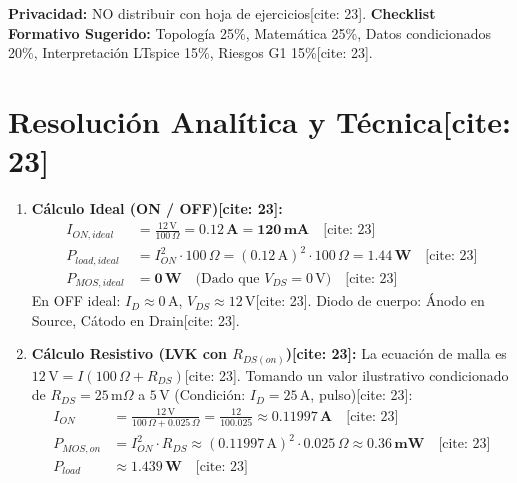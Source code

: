 \documentclass[11pt, a4paper]{article}
\begin{document}
\begin{tcolorbox}[colback=red!5, colframe=red!70!black, title=\textbf{Material Reservado Docente: Clave E1 (IRLZ44N)[cite: 23]}]
    \textbf{Privacidad:} NO distribuir con hoja de ejercicios[cite: 23]. 
    \textbf{Checklist Formativo Sugerido:} Topología 25\%, Matemática 25\%, Datos condicionados 20\%, Interpretación LTspice 15\%, Riesgos G1 15\%[cite: 23].
\end{tcolorbox}

\section*{Resolución Analítica y Técnica[cite: 23]}

\begin{enumerate}
    \setlength\itemsep{0.5em}
    \item \textbf{Cálculo Ideal (ON / OFF)[cite: 23]:}
    \begin{align*}
        I_{ON,ideal} &= \frac{12\,\text{V}}{100\,\Omega} = \mathbf{0.12\,\text{A} = 120\,\text{mA}} \quad \text{[cite: 23]} \\
        P_{load,ideal} &= I_{ON}^2 \cdot 100\,\Omega = (0.12\,\text{A})^2 \cdot 100\,\Omega = \mathbf{1.44\,\text{W}} \quad \text{[cite: 23]} \\
        P_{MOS,ideal} &= \mathbf{0\,\text{W}} \quad \text{(Dado que } V_{DS} = 0\,\text{V}\text{)} \quad \text{[cite: 23]}
    \end{align*}
    En OFF ideal: $I_D \approx 0\,\text{A}$, $V_{DS} \approx 12\,\text{V}$[cite: 23]. Diodo de cuerpo: Ánodo en Source, Cátodo en Drain[cite: 23].
    
    \item \textbf{Cálculo Resistivo (LVK con $R_{DS(on)}$)[cite: 23]:}
    La ecuación de malla es $12\,\text{V} = I (100\,\Omega + R_{DS})$[cite: 23]. 
    Tomando un valor ilustrativo condicionado de $R_{DS} = 25\,\text{m}\Omega$ a $5\,\text{V}$ (Condición: $I_D=25\,\text{A}$, pulso)[cite: 23]:
    \begin{align*}
        I_{ON} &= \frac{12\,\text{V}}{100\,\Omega + 0.025\,\Omega} = \frac{12}{100.025} \approx \mathbf{0.11997\,\text{A}} \quad \text{[cite: 23]} \\
        P_{MOS,on} &= I_{ON}^2 \cdot R_{DS} \approx (0.11997\,\text{A})^2 \cdot 0.025\,\Omega \approx \mathbf{0.36\,\text{mW}} \quad \text{[cite: 23]} \\
        P_{load} &\approx \mathbf{1.439\,\text{W}} \quad \text{[cite: 23]}
    \end{align*}
    

\end{enumerate}
\end{document}
